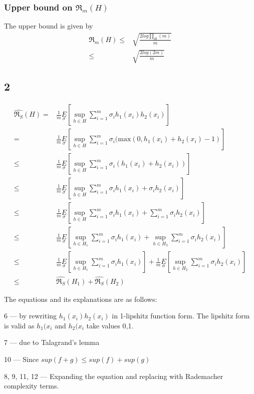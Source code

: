\documentclass{article}
\begin{document}
\subsubsection*{Upper bound on \( \mathfrak{R}_{m}(H)\)}

The upper bound is given by 
\begin{align*}
  \mathfrak{R}_{m}(H) \le & \sqrt{\frac{2log\prod_{H}(m)}{m}}\\
  \le & \sqrt{\frac{2log(2m)}{m}}
\end{align*}

\newpage
\subsection*{2}

\begin{align}
  \hat{\mathfrak{R}_{S}}(H) = & \frac{1}{m} \underset{\sigma}{E} [\sup_{h \in H} \sum_{i = 1}^{m} \sigma_{i}h_{1}(x_{i})h_{2}(x_{i}) ] \\
  = & \frac{1}{m} \underset{\sigma}{E} [\sup_{h \in H} \sum_{i = 1}^{m} \sigma_{i}( \mathrm{max}(0, h_{1}(x_{i}) + h_{2}(x_{i}) - 1 ) ] \\
  \le &\frac{1}{m} \underset{\sigma}{E} [\sup_{h \in H} \sum_{i = 1}^{m} \sigma_{i}( h_{1}(x_{i}) + h_{2}(x_{i})) ] \\ 
  \le &\frac{1}{m} \underset{\sigma}{E} [\sup_{h \in H} \sum_{i = 1}^{m} \sigma_{i}h_{1}(x_{i}) + \sigma_{i}h_{2}(x_{i}) ] \\ 
  \le &\frac{1}{m} \underset{\sigma}{E} [\sup_{h \in H} \sum_{i = 1}^{m} \sigma_{i}h_{1}(x_{i}) + \sum_{i = 1}^{m} \sigma_{i}h_{2}(x_{i}) ] \\ 
  \le &\frac{1}{m} \underset{\sigma}{E} [\sup_{h \in H_{1}} \sum_{i = 1}^{m} \sigma_{i}h_{1}(x_{i}) + \sup_{h \in H_{2}} \sum_{i = 1}^{m} \sigma_{i}h_{2}(x_{i}) ] \\ 
  \le &\frac{1}{m} \underset{\sigma}{E} [\sup_{h \in H_{1}} \sum_{i = 1}^{m} \sigma_{i}h_{1}(x_{i})] + \frac{1}{m} \underset{\sigma}{E}[ \sup_{h \in H_{2}} \sum_{i = 1}^{m} \sigma_{i}h_{2}(x_{i}) ] \\ 
  \le & \hat{\mathfrak{R}_{S}}(H_{1}) + \hat{\mathfrak{R}_{S}}(H_{2})
\end{align}

The equations and its explanations are as follows:

6 --- by rewriting \( h_{1}(x_{i})h_{2}(x_{i})\) in 1-lipshitz function form.  The lipshitz form is valid as \( h_{1}(x_{i}\) and \( h_{2}(x_{i}\) take values {0,1}.

7 --- due to Talagrand's lemma

10 --- Since \(sup(f+g) \le sup(f) + sup(g) \)

8, 9, 11, 12 --- Expanding the equation and replacing with Rademacher complexity terms.
\end{document}
